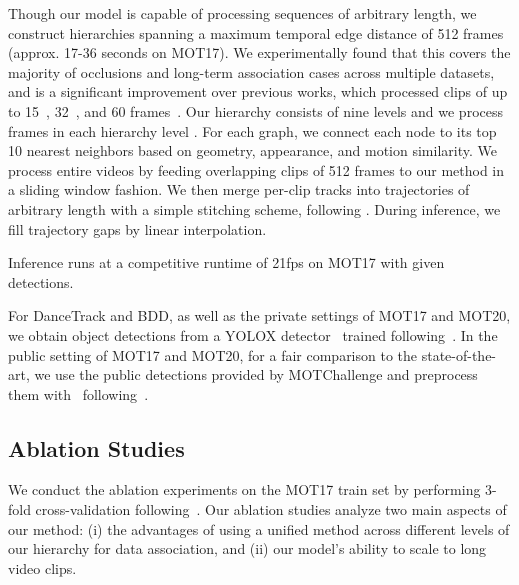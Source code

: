 \documentclass[10pt,twocolumn,letterpaper]{article}
\begin{document}
{{ Though our model is capable of processing sequences of arbitrary length, we construct hierarchies spanning a maximum temporal edge distance of 512 frames (approx. 17-36 seconds on MOT17). We experimentally found that this covers the majority of occlusions and long-term association cases across multiple datasets, and is a significant improvement over previous works, which processed clips of up to 15~\cite{mpntrack}, 32~\cite{zhou2022global}, and 60 frames~\cite{lift, aplift}.
Our hierarchy consists of nine levels and we process  frames in each hierarchy level . For each graph, we connect each node to its top 10 nearest neighbors based on geometry, appearance, and motion similarity. We process entire videos by feeding overlapping clips of 512 frames to our method in a sliding window fashion. We then merge per-clip tracks into trajectories of arbitrary length with a simple stitching scheme, following \cite{mpntrack}. During inference, we fill trajectory gaps by linear interpolation. 

 Inference runs at a competitive runtime of 21fps on MOT17 with given detections.




 For DanceTrack and BDD, as well as the private settings of MOT17 and MOT20, we obtain object detections from a YOLOX detector~\cite{ge2021yolox} trained following~\cite{bytetrack}. In the public setting of MOT17 and MOT20, for a fair comparison to the state-of-the-art, we use the public detections provided by MOTChallenge and preprocess them with~\cite{tracktor} following~\cite{mpntrack, lift,  lpc, gmt}.



\subsection{Ablation Studies}
We conduct the ablation experiments on the MOT17 train set by performing 3-fold cross-validation following~\cite{mpntrack}. Our
ablation studies analyze two main aspects of our method: 
(i) the advantages of using a unified method across different levels of our hierarchy for data association, and
(ii) our model's ability to scale to long video clips.
















}}
\end{document}
